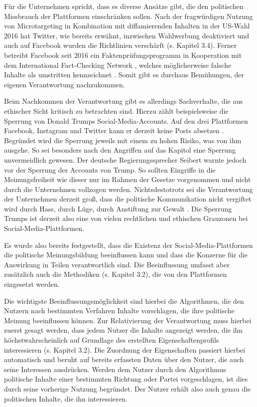 Für die Unternehmen spricht, dass es diverse Ansätze gibt, die den politischen Missbrauch der Plattformen einschränken sollen. Nach der fragwürdigen Nutzung von Microtargeting \autocite[vgl.][]{MicrotargetingBPB} in Kombination mit diffamierenden Inhalten in der US-Wahl 2016 hat Twitter, wie bereits erwähnt, inzwischen Wahlwerbung deaktiviert \autocite[vgl.][]{twitterPolitischerInhalt} und auch auf Facebook wurden die Richtlinien verschärft \autocite{facebookPolitischeWerbung}(s. Kapitel 3.4). Ferner betreibt Facebook seit 2016 ein \glqq Faktenprüfungsprogramm\grqq{} in Kooperation mit dem \glqq International Fact-Checking Network\grqq{} \autocite[vgl.][]{FactCheckFB}, welches möglicherweise falsche Inhalte als \glqq umstritten\grqq{} kennzeichnet \autocite[vgl.][]{FactCheckFBAlert}. Somit gibt es durchaus Bemühungen, der eigenen Verantwortung nachzukommen.

Beim Nachkommen der Verantwortung gibt es allerdings Sachverhalte, die aus ethischer Sicht kritisch zu betrachten sind. Hierzu zählt beispielsweise die Sperrung von Donald Trumps Social-Media-Accounts. 
Auf den drei Plattformen Facebook, Instagram und Twitter kann er derzeit keine Posts absetzen \autocite[vgl.][]{BanTrumpFBInsta}\autocite[vgl.][]{BanTrumpTwitter}. Begründet wird die Sperrung jeweils mit einem zu hohen Risiko, was von ihm ausgehe. So sei besonders nach den Angriffen auf das Kapitol eine Sperrung unvermeidlich gewesen. Der deutsche Regierungssprecher Seibert warnte jedoch vor der Sperrung der Accounts von Trump. So sollten Eingriffe in die Meinungsfreiheit wie dieser nur im Rahmen der Gesetze vorgenommen und nicht durch die Unternehmen vollzogen werden. Nichtsdestotrotz sei die Verantwortung der Unternehmen derzeit groß, dass die \glqq politische Kommunikation nicht vergiftet wird durch Hass, durch Lüge, durch Anstiftung zur Gewalt\grqq{} \autocite[vgl.][]{ARDMerkelTrump} \autocite[vgl.][]{ZDFMerkelTrump}. Die Sperrung Trumps ist derzeit also eine von vielen rechtlichen und ethischen Grauzonen bei Social-Media-Plattformen. 

Es wurde also bereits festgestellt, dass die Existenz der Social-Media-Plattformen die politische Meinungsbildung beeinflussen kann und dass die Konzerne für die Auswirkung in Teilen verantwortlich sind. Die Beeinflussung umfasst aber zusätzlich auch die Methodiken (s. Kapitel 3.2), die von den Plattformen eingesetzt werden.

Die wichtigste Beeinflussungsmöglichkeit sind hierbei die Algorithmen, die den Nutzern nach bestimmten Verfahren Inhalte vorschlagen, die ihre politische Meinung beeinflussen können. Zur Relativierung der Verantwortung muss hierbei zuerst gesagt werden, dass jedem Nutzer die Inhalte angezeigt werden, die ihn höchstwahrscheinlich auf Grundlage des erstellten Eigenschaftenprofils interessieren (s. Kapitel 3.2). Die Zuordnung der Eigenschaften passiert hierbei automatisch und beruht auf bereits erfassten Daten über den Nutzer, die auch seine Interessen ausdrücken. Werden dem Nutzer durch den Algorithmus politische Inhalte einer bestimmten Richtung oder Partei vorgeschlagen, ist dies durch seine vorherige Nutzung begründet. Der Nutzer erhält also auch genau die politischen Inhalte, die ihn interessieren.

